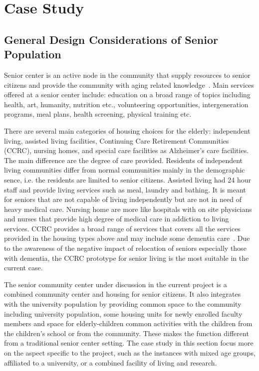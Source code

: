 
\chapter{Case Study} %

\label{Chapter2} %



\section{General Design Considerations of Senior Population}
Senior center is an active node in the community that supply resources
to senior citizens and provide the community with aging related
knowledge~\cite{Dalsanto2009}. Main services offered at a senior
center include: education on a broad range of topics including health,
art, humanity, nutrition etc., volunteering opportunities,
intergeneration programs, meal plans, health screening, physical
training etc. 

There are several main categories of housing choices for the elderly:
independent living, assisted living facilities, Continuing Care
Retirement Communities (CCRC), nursing homes, and special care
facilities as Alzheimer's care facilities. The main difference are the
degree of care provided. Residents of independent living communities
differ from normal communities mainly in the demographic sence,
i.e. the residents are limited to senior citizens. Assisted living had
24 hour staff and provide living services such as meal, laundry and
bathing. It is meant for seniors that are not capable of living
independently but are not in need of heavy medical care. Nursing home
are more like hospitals with on site physicians and nurses that
provide high degree of medical care in addiction to living
services. CCRC provides a broad range of services that covers all the
services provided in the housing types above and may include some
dementia care~\cite{JFCS2015}. Due to the awareness of the negative
impact of relocation of seniors especially those with dementia, the
CCRC prototype for senior living is the most suitable in the current
case.

The senior community center under discussion in the current project is
a combined community center and housing for senior citizens. It also
integrates with the university population by providing common space to
the community including university population, some housing units for
newly enrolled faculty members and space for elderly-children common
activities with the children from the children's school or from the
community. These makes the function different from a traditional
senior center setting. The case study in this section focus more on
the aspect specific to the project, such as the instances with mixed
age groups, affiliated to a university, or a combined facility of
living and research.

